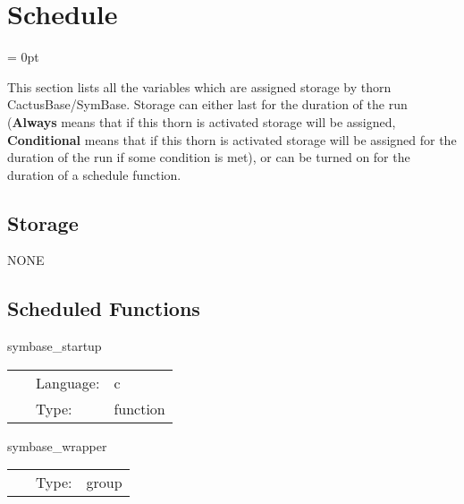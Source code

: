 
\section{Schedule} 


\parskip = 0pt


\noindent This section lists all the variables which are assigned storage by thorn CactusBase/SymBase.  Storage can either last for the duration of the run ({\bf Always} means that if this thorn is activated storage will be assigned, {\bf Conditional} means that if this thorn is activated storage will be assigned for the duration of the run if some condition is met), or can be turned on for the duration of a schedule function.


\subsection*{Storage}NONE
\subsection*{Scheduled Functions}
\vspace{5mm}


\hspace{5mm} symbase\_startup 

\hspace{5mm}{\it register gh extension for symbase } 


\hspace{5mm}

 \begin{tabular*}{160mm}{cll} 
~ & Language:  & c \\ 
~ & Type:  & function \\ 
\end{tabular*} 


\vspace{5mm}


\hspace{5mm} symbase\_wrapper 

\hspace{5mm}{\it wrapper group for symbase } 


\hspace{5mm}

 \begin{tabular*}{160mm}{cll} 
~ & Type:  & group \\ 
\end{tabular*} 


